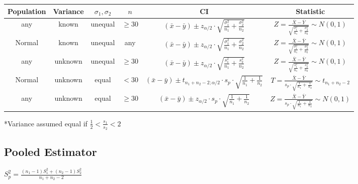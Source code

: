 \documentclass[12pt, a4paper]{article}
\begin{document}
\begin{multicols*}{3}
\begin{center}
\renewcommand{\arraystretch}{1.5}
\begin{tabular}{|c|c|c|c|c|c|}
\hline
\textbf{Population} & \textbf{Variance} & \( \sigma_1, \sigma_2 \) & \( n \) & \textbf{CI} & \textbf{Statistic} \\
\hline
any & known & unequal & \( \geq 30 \) & 
\(\displaystyle (\bar{x} - \bar{y}) \pm z_{\alpha /2} \cdot \sqrt{\frac{\sigma_1^2}{n_1} + \frac{\sigma_2^2}{n_2}} \) & 
\(\displaystyle Z = \frac{\bar{X} - \bar{Y}}{\sqrt{\frac{\sigma_1^2}{n_1} + \frac{\sigma_2^2}{n_2}}} \sim N(0, 1) \) \\
\hline
Normal & known & unequal & any & 
\(\displaystyle (\bar{x} - \bar{y}) \pm z_{\alpha /2} \cdot \sqrt{\frac{\sigma_1^2}{n_1} + \frac{\sigma_2^2}{n_2}} \) & 
\(\displaystyle Z = \frac{\bar{X} - \bar{Y}}{\sqrt{\frac{\sigma_1^2}{n_1} + \frac{\sigma_2^2}{n_2}}} \sim N(0, 1) \) \\
\hline
any & unknown & unequal & \( \geq 30 \) & 
\(\displaystyle (\bar{x} - \bar{y}) \pm z_{\alpha /2} \cdot \sqrt{\frac{s_1^2}{n_1} + \frac{s_2^2}{n_2}} \) & 
\(\displaystyle Z = \frac{\bar{X} - \bar{Y}}{\sqrt{\frac{s_1^2}{n_1} + \frac{s_2^2}{n_2}}} \sim N(0, 1) \) \\
\hline
Normal & unknown & equal & \( < 30 \) & 
\(\displaystyle (\bar{x} - \bar{y}) \pm t_{n_1 + n_2 - 2; \alpha/2} \cdot s_p \cdot \sqrt{\frac{1}{n_1} + \frac{1}{n_2}} \) & 
\(\displaystyle T = \frac{\bar{X} - \bar{Y}}{s_p \cdot \sqrt{\frac{1}{n_1} + \frac{1}{n_2}}} \sim t_{n_1 + n_2 - 2} \) \\
\hline
any & unknown & equal & \( \geq 30 \) & 
\(\displaystyle (\bar{x} - \bar{y}) \pm z_{\alpha /2} \cdot s_p \cdot \sqrt{\frac{1}{n_1} + \frac{1}{n_2}} \) & 
\(\displaystyle Z =\frac{\bar{X} - \bar{Y}}{s_p \cdot \sqrt{\frac{1}{n_1} + \frac{1}{n_2}}} \sim N(0, 1) \) \\
\hline
\end{tabular}
\end{center}

*Variance assumed equal if $\frac{1}{2} < \frac{s_1}{s_2} < 2$

\subsection*{Pooled Estimator}

$\displaystyle S^2_p = \frac{(n_1-1)S^2_1+(n_2-1)S^2_2}{n_1+n_2-2}$

\colbreak
\end{multicols*}
\end{document}
